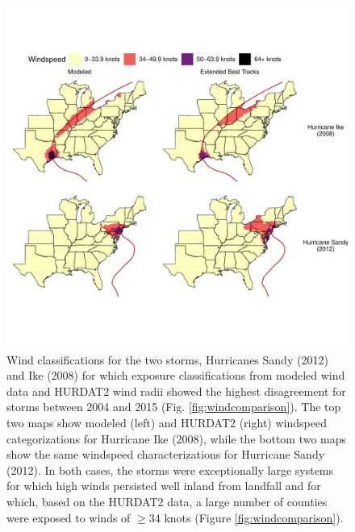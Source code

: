 \documentclass[fleqn,10pt,lineno]{olplainarticle}
\begin{document}
\begin{figure}[tbhp!]
\centering
\includegraphics[width=\linewidth]{figures/windexamples}
\caption{Wind classifications for the two storms, Hurricanes Sandy (2012) and Ike (2008) for which exposure classifications from modeled wind data \cite{stormwindmodel} and HURDAT2 wind radii \cite{demuth2006improvement} showed the highest disagreement for storms between 2004 and 2015 (Fig. \ref{fig:windcomparison}). The top two maps show modeled (left) and HURDAT2 (right) windspeed categorizations for Hurricane Ike (2008), while the bottom two maps show the same windspeed characterizations for Hurricane Sandy (2012). In both cases, the storms were exceptionally large systems for which high winds persisted well inland from landfall and for which, based on the HURDAT2 data, a large number of counties were exposed to winds of $\ge$34 knots (Figure \ref{fig:windcomparison}).}
\label{fig:windexamples}
\end{figure}
\end{document}
